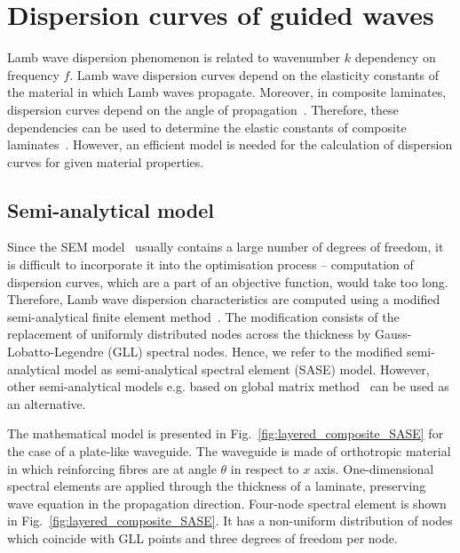 \documentclass[preprint,12pt]{elsarticle}
\begin{document}
\section{Dispersion curves of guided waves \label{sec:dispersion_curves}}
Lamb wave dispersion phenomenon is related to wavenumber $k$ dependency on frequency $f$. 
Lamb wave dispersion curves depend on the elasticity constants of the material in which Lamb waves propagate. 
Moreover, in composite laminates, dispersion curves depend on the angle of propagation~\cite{Rose1999}. 
Therefore, these dependencies can be used to determine the elastic constants of composite laminates~\cite{Kudela2020}.
However, an efficient model is needed for the calculation of dispersion curves for given material properties.

\subsection{Semi-analytical model}
Since the SEM model~\cite{Kudela2020a,Rucka2011} usually contains a large number of degrees of freedom, it is difficult to incorporate it into the optimisation process – computation of dispersion curves, which are a part of an objective function, would take too long. 
Therefore, Lamb wave dispersion characteristics are computed using a modified semi-analytical finite element method~\cite{Bartoli2006,Marzani2008}. 
The modification consists of the replacement of uniformly distributed nodes across the thickness by Gauss-Lobatto-Legendre (GLL) spectral nodes. 
Hence, we refer to the modified semi-analytical model as semi-analytical spectral element (SASE) model.
However, other semi-analytical models e.g. based on global matrix method~\cite{Pol2013} can be used as an alternative.
	
The mathematical model is presented in Fig.~\ref{fig:layered_composite_SASE} for the case of a plate-like waveguide.  
The waveguide is made of orthotropic material in which reinforcing fibres are at angle $\theta$ in respect to $x$ axis.
One-dimensional spectral elements are applied through the thickness of a laminate, preserving wave equation in the propagation direction.  
Four-node spectral element is shown in Fig.~\ref{fig:layered_composite_SASE}. 
It has a non-uniform distribution of nodes which coincide with GLL points and three degrees of freedom per node.
	
\end{document}
